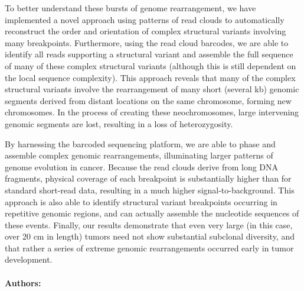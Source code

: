 To better understand these bursts of genome rearrangement, we have
implemented a novel approach using patterns of read clouds to automatically reconstruct the order and orientation of complex structural variants
involving many breakpoints. Furthermore, using the read cloud barcodes,
we are able to identify all reads supporting a structural variant and assemble
the full sequence of many of these complex structural variants (although this
is still dependent on the local sequence complexity). This approach reveals
that many of the complex structural variants involve the rearrangement of
many short (several kb) genomic segments derived from distant locations
on the same chromosome, forming new chromosomes. In the process of creating these neochromosomes, large intervening genomic segments are lost,
resulting in a loss of heterozygosity.

 By harnessing the barcoded sequencing platform, we are
able to phase and assemble complex genomic rearrangements, illuminating larger patterns of genome evolution in cancer. Because the read clouds
derive from long DNA fragments, physical coverage of each breakpoint is
substantially higher than for standard short-read data, resulting in a much
higher signal-to-background. This approach is also able to identify structural
variant breakpoints occurring in repetitive genomic regions, and can actually assemble the nucleotide sequences of these events. Finally, our results
demonstrate that even very large (in this case, over 20 cm in length) tumors
need not show substantial subclonal diversity, and that rather a series of
extreme genomic rearrangements occurred early in tumor development.

\noindent \paragraph{Authors:} 


